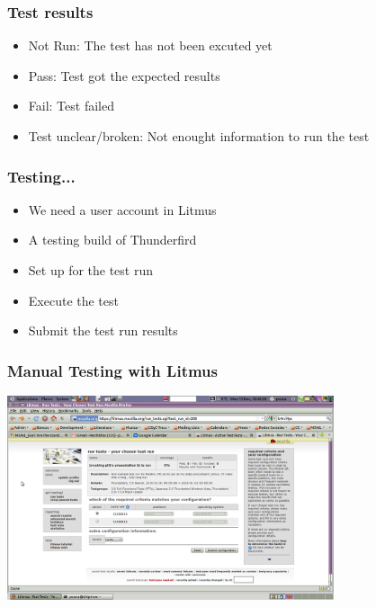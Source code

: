 \documentclass{beamer}
\begin{document}

\begin{frame}
\frametitle{Test results}
 \begin{itemize}
   \item Not Run: The test has not been excuted yet
   \item Pass: Test got the expected results
   \item Fail: Test failed
   \item Test unclear/broken: Not enought information to run the test
 \end{itemize}
\end{frame}


\begin{frame}
\frametitle{Testing...}
 \begin{itemize}
   \item We need a user account in Litmus
   \item A testing build of Thunderfird
   \item Set up for the test run
   \item Execute the test
   \item Submit the test run results
 \end{itemize}
\end{frame}


\begin{frame}
\frametitle{Manual Testing with Litmus}
\begin{center}
 \includegraphics[height=6cm]{figs/Litmus_01_Config_Required_Criteria.png}
\begin{figure}
\end{figure}
\end{center}
\end{frame}
\end{document}
